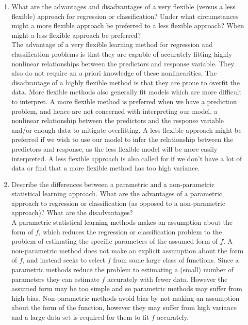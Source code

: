 \documentclass[11pt]{article}
\begin{document}
\begin{enumerate}
\item What are the advantages and disadvantages of a very flexible (versus a less flexible) approach for regression or classification?  Under what circumstances might a more flexible approach be preferred to a less flexible approach?  When might a less flexible approach be preferred?\\

The advantage of a very flexible learning method for regression and classification problems is that they are capable of accurately fitting highly nonlinear relationships between the predictors and response variable.  They also do not require an a priori knowledge of these nonlinearities.  The disadvantage of a highly flexible method is that they are prone to overfit the data.  More flexible methods also generally fit models which are more difficult to interpret.  A more flexible method is preferred when we have a prediction problem, and hence are not concerned with interpreting our model, a nonlinear relationship between the predictors and the response variable and/or enough data to mitigate overfitting.  A less flexible approach might be preferred if we wish to use our model to infer the relationship between the predictors and response, as the less flexible model will be more easily interpreted. A less flexible approach is also called for if we don't have a lot of data or find that a more flexible method has too high variance.    

\item Describe the differences between a parametric and a non-parametric statistical learning approach.  What are the advantages of a parametric approach to regression or classification (as opposed to a non-parametric approach)?  What are the disadvantages?\\

A parametric statistical learning methods makes an assumption about the form of $f$, which reduces the regression or classification problem to the problem of estimating the specific parameters of the assumed form of $f$.  A non-parametric method does not make an explicit assumption about the form of $f$, and instead seeks to select $f$ from some large class of functions.  Since a parametric methods reduce the problem to estimating a (small) number of parameters they can estimate $f$ accurately with fewer data.  However the assumed form may be too simple and so parametric methods may suffer from high bias.  Non-parametric methods avoid bias by not making an assumption about the form of the function, however they may suffer from high variance and a large data set is required for them to fit $f$ accurately. 


\end{enumerate}
\end{document}
